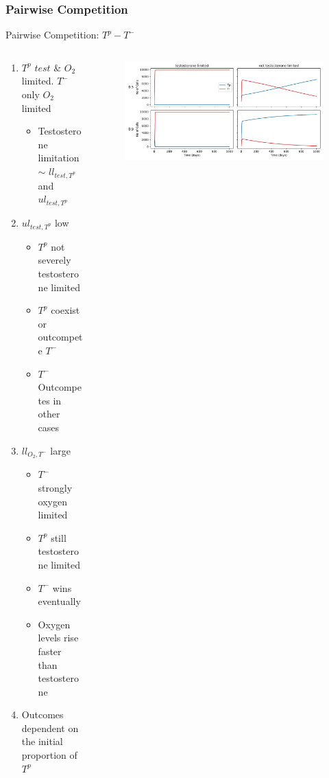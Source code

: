 \documentclass[aspectratio=169,9pt]{beamer}
\begin{document}
\subsubsection{Pairwise Competition}
\begin{frame}{Pairwise Competition: $T^p - T^-$}
  \begin{columns}
    \begin{column}{0.5\textwidth}
      \begin{enumerate}
        \item<1-> $T^p$ $test$ \& $O_2$ limited. $T^-$ only $O_2$ limited
          \begin{itemize}
            \item Testosterone limitation $\sim$ $ll_{test,T^p}$ and $ul_{test,T^p}$
          \end{itemize}
        \item<2-> $ul_{test,T^p}$ low
        \begin{itemize}
          \item $T^p$ not severely testosterone limited
          \item $T^p$ coexist or outcompete $T^-$
          \item $T^-$ Outcompetes in other cases
        \end{itemize}
        \item<3-> $ll_{O_2,T^-}$ large
        \begin{itemize}
          \item $T^-$ strongly oxygen limited
          \item $T^p$ still testosterone limited
          \item $T^-$ wins eventually
          \item Oxygen levels rise faster than testosterone
        \end{itemize}
        \item<4-> Outcomes dependent on the initial proportion of $T^p$
      \end{enumerate}
    \end{column}
    \begin{column}{0.5\textwidth}
      \begin{figure}[h]
        \centering
        \includegraphics[width=\textwidth]{Tpro-Tneg}

\end{figure}
\end{column}
\end{columns}
\end{frame}
\end{document}
